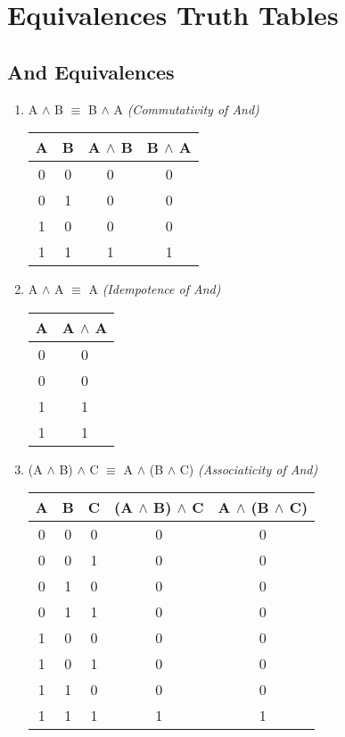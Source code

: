 \documentclass{report}
\begin{document}

\appendix
\chapter{Equivalences Truth Tables}
\section{And Equivalences}
\begin{enumerate}

  \item A $\land$ B $\equiv$ B $\land$ A \emph{(Commutativity of And)}

\begin{center}
  \begin{tabular}{| c | c | c | c |}
    \hline
    A & B & A $\land$ B & B $\land$ A \\ \hline
    0 & 0 & 0 & 0 \\
    0 & 1 & 0 & 0 \\
    1 & 0 & 0 & 0 \\
    1 & 1 & 1 & 1 \\ \hline
  \end{tabular}
\end{center}

  \item A $\land$ A $\equiv$ A \emph{(Idempotence of And)}

\begin{center}
  \begin{tabular}{| c | c |}
    \hline
    A & A $\land$ A \\ \hline
    0 & 0 \\
    0 & 0 \\
    1 & 1 \\
    1 & 1 \\ \hline
  \end{tabular}
\end{center}

  \item (A $\land$ B) $\land$ C $\equiv$ A $\land$ (B $\land$ C) \emph{(Associaticity of And)}

\begin{center}
  \begin{tabular}{| c | c | c | c | c |}
    \hline
    A & B & C & (A $\land$ B) $\land$ C & A $\land$ (B $\land$ C) \\ \hline
    0 & 0 & 0 & 0 & 0 \\
    0 & 0 & 1 & 0 & 0 \\
    0 & 1 & 0 & 0 & 0 \\
    0 & 1 & 1 & 0 & 0 \\
    1 & 0 & 0 & 0 & 0 \\
    1 & 0 & 1 & 0 & 0 \\
    1 & 1 & 0 & 0 & 0 \\
    1 & 1 & 1 & 1 & 1 \\ \hline
  \end{tabular}
\end{center}
\end{enumerate}
\end{document}
